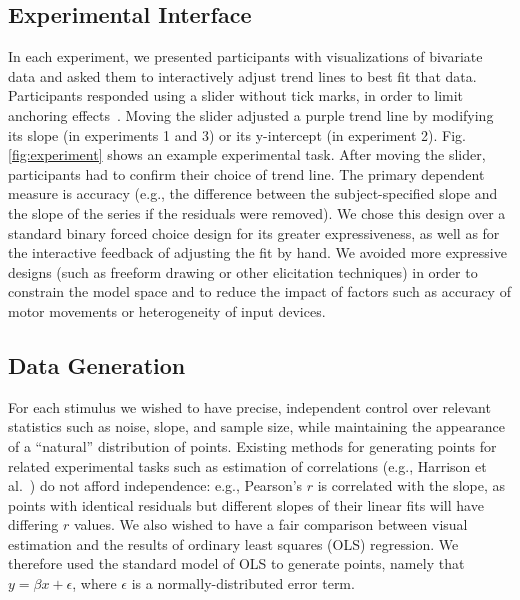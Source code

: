 \documentclass{sigchi}
\begin{document}
\subsection{Experimental Interface}

In each experiment, we presented participants with visualizations of bivariate data and asked them to interactively adjust trend lines to best fit that data. Participants responded using a slider without tick marks, in order to limit anchoring effects~\cite{matejka2016effect}. Moving the slider adjusted a purple trend line by modifying its slope (in experiments 1 and 3) or its y-intercept (in experiment 2). Fig. \ref{fig:experiment} shows an example experimental task. After moving the slider, participants had to confirm their choice of trend line. The primary dependent measure is accuracy (e.g., the difference between the subject-specified slope and the slope of the series if the residuals were removed). We chose this design over a standard binary forced choice design for its greater expressiveness, as well as for the interactive feedback of adjusting the fit by hand. We avoided more expressive designs (such as freeform drawing or other elicitation techniques) in order to constrain the model space and to reduce the impact of factors such as accuracy of motor movements or heterogeneity of input devices.

\subsection{Data Generation}

For each stimulus we wished to have precise, independent control over relevant statistics such as noise, slope, and sample size, while maintaining the appearance of a ``natural'' distribution of points. Existing methods for generating points for related experimental tasks such as estimation of correlations (e.g., Harrison et al.~\cite{harrison2014ranking}) do not afford independence: e.g., Pearson's $r$ is correlated with the slope, as points with identical residuals but different slopes of their linear fits will have differing $r$ values. We also wished to have a fair comparison between visual estimation and the results of ordinary least squares (OLS) regression. We therefore used the standard model of OLS to generate points, namely that $y=\beta x + \epsilon$, where $\epsilon$ is a normally-distributed error term.
\end{document}
